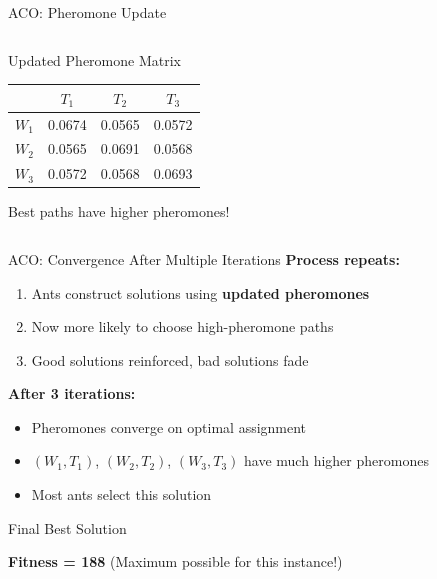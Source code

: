 \documentclass[aspectratio=43,8pt]{beamer}
\begin{document}
\begin{frame}{ACO: Pheromone Update}
\begin{columns}[t]
\begin{exampleblock}{Updated Pheromone Matrix}
\centering
\small
\begin{tabular}{c|ccc}
\toprule
& $T_1$ & $T_2$ & $T_3$ \\
\midrule
$W_1$ & \textcolor{accentgreen}{0.0674} & 0.0565 & 0.0572 \\
$W_2$ & 0.0565 & \textcolor{accentgreen}{0.0691} & 0.0568 \\
$W_3$ & 0.0572 & 0.0568 & \textcolor{accentgreen}{0.0693} \\
\bottomrule
\end{tabular}

\vspace{0.2cm}
{\footnotesize Best paths have higher pheromones!}
\end{exampleblock}
\end{columns}
\end{frame}

\begin{frame}{ACO: Convergence After Multiple Iterations}
\textbf{Process repeats:}
\begin{enumerate}
    \item Ants construct solutions using \textbf{updated pheromones}
    \item Now more likely to choose high-pheromone paths
    \item Good solutions reinforced, bad solutions fade
\end{enumerate}

\vspace{0.3cm}
\textbf{After 3 iterations:}
\begin{itemize}
    \item Pheromones converge on optimal assignment
    \item $(W_1,T_1)$, $(W_2,T_2)$, $(W_3,T_3)$ have much higher pheromones
    \item Most ants select this solution
\end{itemize}

\vspace{0.3cm}
\begin{alertblock}{Final Best Solution}
\begin{center}

\vspace{0.2cm}
\textbf{Fitness = 188} (Maximum possible for this instance!)
\end{center}
\end{alertblock}
\end{frame}
\end{document}

